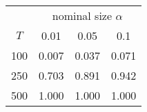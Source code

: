 % 
\begin{tabular}{cccc}
  \hline
  & \multicolumn{3}{c}{nominal size $\alpha$} \\
 $T$ & 0.01 & 0.05 & 0.1 \\
 \hline
100 & 0.007 & 0.037 & 0.071 \\ 
  250 & 0.703 & 0.891 & 0.942 \\ 
  500 & 1.000 & 1.000 & 1.000 \\ 
   \hline
\end{tabular}
